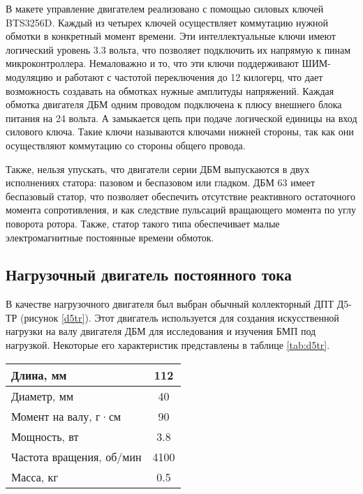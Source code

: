 В макете управление двигателем реализовано с помощью силовых ключей BTS3256D. Каждый из четырех
ключей осуществляет коммутацию нужной обмотки в конкретный момент времени. Эти интеллектуальные ключи
имеют логический уровень 3.3 вольта, что позволяет подключить их напрямую к пинам микроконтроллера.
Немаловажно и то, что эти ключи поддерживают ШИМ-модуляцию и работают с частотой переключения до 12 килогерц, 
что дает возможность создавать на обмотках 
нужные амплитуды напряжений. Каждая обмотка двигателя ДБМ одним проводом подключена к плюсу внешнего 
блока питания на 24 вольта. А замыкается цепь при подаче логической единицы на вход силового ключа.
Такие ключи называются ключами нижней стороны, так как они осуществляют коммутацию со стороны общего провода.

Также, нельзя упускать, что двигатели серии ДБМ выпускаются в двух исполнениях статора: 
пазовом и беспазовом или гладком. ДБМ 63 имеет беспазовый статор, что позволяет обеспечить
отсутствие реактивного остаточного момента сопротивления, и как следствие 
пульсаций вращающего момента по углу поворота ротора. Также, статор
такого типа обеспечивает малые электромагнитные постоянные времени обмоток.

\subsection{Нагрузочный двигатель постоянного тока}

В качестве нагрузочного двигателя был выбран обычный коллекторный ДПТ Д5-ТР (рисунок \ref{d5tr}). 
Этот двигатель используется для создания искусственной нагрузки на валу 
двигателя ДБМ для исследования и изучения БМП под нагрузкой. Некоторые его характеристик
представлены в таблице \ref{tab:d5tr}.


\begin{tabularx}{\textwidth}{|X|c|}
  \caption{Характеристики двигателя Д5-ТР}\label{tab:d5tr}\\
  \hline
    Длина, мм & 112 \\
  \hline
    Диаметр, мм & 40 \\
  \hline
    Момент на валу, г·см & 90 \\
  \hline
    Мощность, вт & 3.8 \\
  \hline
    Частота вращения, об/мин & 4100 \\
  \hline
    Масса, кг & 0.5 \\
  \hline
\end{tabularx}

